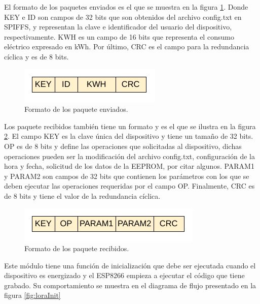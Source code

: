 El formato de los paquetes enviados es el que se muestra en la figura \ref{fig:loraTxPacket}. Donde KEY e ID son campos de 32 bits que son obtenidos del archivo config.txt en SPIFFS, y representan la clave e identificador del usuario del dispositivo, respectivamente. KWH es un campo de 16 bits que representa el consumo eléctrico expresado en kWh. Por último, CRC es el campo para la redundancia cíclica y es de 8 bits.
\begin{figure}[h]
	\centering
	\includegraphics[scale=1]{./Figures/lora_communication_tx_packet.pdf}
	\caption{Formato de los paquete enviados.}
		\label{fig:loraTxPacket}
\end{figure}

Los paquete recibidos también tiene un formato y es el que se ilustra en la figura \ref{fig:loraRxPacket}. El campo KEY es la clave única del dispositivo y tiene un tamaño de 32 bits. OP es de 8 bits y define las operaciones que solicitadas al dispositivo, dichas operaciones pueden ser la modificación del archivo config.txt, configuración de la hora y fecha, solicitud de los datos de la EEPROM, por citar algunos. PARAM1 y PARAM2 son campos de 32 bits que contienen los parámetros con los que se deben ejecutar las operaciones requeridas por el campo OP. Finalmente, CRC es de 8 bits y tiene el valor de la redundancia cíclica.

\begin{figure}[h]
	\centering
	\includegraphics[scale=1]{./Figures/lora_communication_rx_packet.pdf}
	\caption{Formato de los paquete recibidos.}
		\label{fig:loraRxPacket}
\end{figure}

Este módulo tiene una función de inicialización que debe ser ejecutada cuando el dispositivo es energizado y el ESP8266 empieza a ejecutar el código que tiene grabado. Su comportamiento se muestra en el diagrama de flujo presentado en la figura \ref{fig:loraInit}

